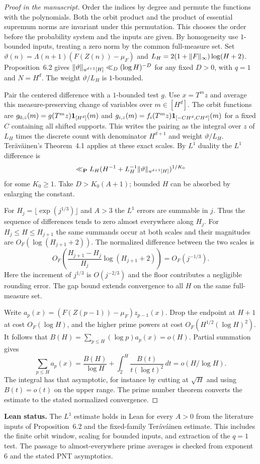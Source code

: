 \begin{proof}[Proof in the manuscript]
\leanok
Order the indices by degree and permute the functions with the
polynomials. Both the orbit product and the product of essential
supremum norms are invariant under this permutation. This chooses
the order before the probability system and the inputs are given.
By homogeneity use $1$-bounded inputs, treating a zero norm
by the common full-measure set.
Set $\vartheta(n)=\Lambda(n+1)(F(Z(n))-\mu_F)$ and
$L_H=2(1+\lVert F\rVert_\infty)\log(H+2)$.
Proposition~6.2 gives
$\lVert\vartheta\rVert_{u^{d+1}[H]}\ll_D(\log H)^{-D}$ for any
fixed $D>0$, with $q=1$ and $N=H^d$.
The weight $\vartheta/L_H$ is $1$-bounded.

Pair the centered difference with a $1$-bounded test $g$.
Use $x=T^mz$ and average this measure-preserving change of
variables over $m\in[H^d]$. The orbit functions are
$g_{0,z}(m)=g(T^mz)\mathbf 1_{[H^d]}(m)$ and
$g_{i,z}(m)=f_i(T^mz)\mathbf 1_{[-CH^d,CH^d]}(m)$
for a fixed $C$ containing all shifted supports. This writes
the pairing as the integral over $z$ of $L_H$ times the
discrete count with denominator $H^{d+1}$ and weight
$\vartheta/L_H$. Ter\"av\"ainen's Theorem~4.1 applies at
these exact scales. By $L^1$ duality the $L^1$ difference is
\[
 \ll_{\mathbf P} L_H
    (H^{-1}+L_H^{-1}\lVert\vartheta\rVert_{u^{d+1}[H]})^{1/K_0}
\]
for some $K_0\ge1$. Take $D>K_0(A+1)$; bounded $H$ can be
absorbed by enlarging the constant.

For $H_j=\lfloor\exp(j^{1/3})\rfloor$ and $A>3$ the
$L^1$ errors are summable in $j$. Thus the sequence of
differences tends to zero almost everywhere along $H_j$.
For $H_j\le H\le H_{j+1}$ the same summands occur at both
scales and their magnitudes are $O_F(\log(H_{j+1}+2))$.
The normalized difference between the two scales is
\[
 O_F\left(\frac{H_{j+1}-H_j}{H_j}\log(H_{j+1}+2)\right)
 =O_F(j^{-1/3}).
\]
Here the increment of $j^{1/3}$ is $O(j^{-2/3})$ and the floor
contributes a negligible rounding error. The gap bound extends
convergence to all $H$ on the same full-measure set.

Write $a_p(x)=(F(Z(p-1))-\mu_F)z_{p-1}(x)$.
Drop the endpoint at $H+1$ at cost $O_F(\log H)$, and the
higher prime powers at cost $O_F(H^{1/2}(\log H)^2)$.
It follows that $B(H)=\sum_{p\le H}(\log p)a_p(x)=o(H)$.
Partial summation gives
\[
 \sum_{p\le H}a_p(x)
 =\frac{B(H)}{\log H}
    +\int_2^H\frac{B(t)}{t(\log t)^2}\,dt=o(H/\log H).
\]
The integral has that asymptotic, for instance by cutting at
$\sqrt H$ and using $B(t)=o(t)$ on the upper range.
The prime number theorem converts the estimate to the stated
normalized convergence.
\end{proof}
\noindent\textbf{Lean status.} The $L^1$ estimate holds in Lean for
every $A>0$ from the literature inputs of Proposition~6.2 and the
fixed-family Ter\'av\'ainen estimate. This includes the finite orbit
window, scaling for bounded inputs, and extraction of the $q=1$
test. The passage to almost-everywhere prime averages is checked
from exponent $6$ and the stated PNT asymptotics.

